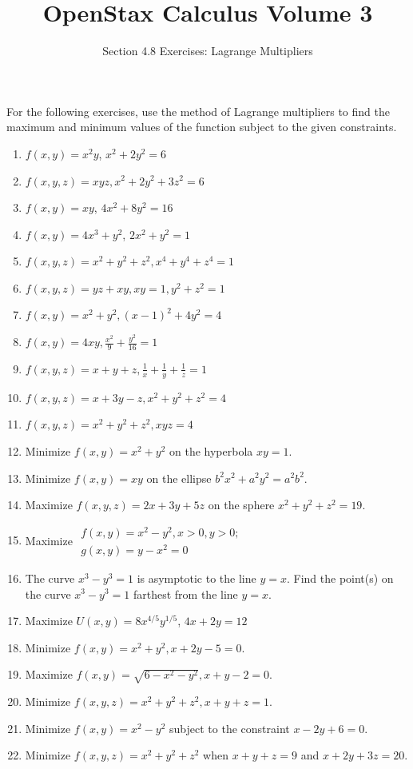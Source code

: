 \documentclass{exercises}
\title{OpenStax Calculus Volume 3}
\subtitle{Section 4.8 Exercises: Lagrange Multipliers}
\author{}
\date{}
\begin{document}
\maketitle


For the following exercises, use the method of Lagrange multipliers to find the maximum and minimum values of the function subject to the given constraints.

\begin{enumerate}[start=1]
\item $f(x,y)=x^{2}y$, $x^{2}+2y^{2}=6$
\item $f(x,y,z)=xyz,x^{2}+2y^{2}+3z^{2}=6$
\item $f(x,y)=xy$, $4x^{2}+8y^{2}=16$
\item $f(x,y)=4x^{3}+y^{2}$, $2x^{2}+y^{2}=1$
\item $f(x,y,z)=x^{2}+y^{2}+z^{2},x^{4}+y^{4}+z^{4}=1$
\item $f(x,y,z)=yz+xy,xy=1,y^{2}+z^{2}=1$
\item $f(x,y)=x^{2}+y^{2},{(x-1)}^{2}+4y^{2}=4$
\item $f(x,y)=4xy,\frac{x^{2}}{9}+\frac{y^{2}}{16}=1$
\item $f(x,y,z)=x+y+z,\frac{1}{x}+\frac{1}{y}+\frac{1}{z}=1$
\item $f(x,y,z)=x+3y-z,x^{2}+y^{2}+z^{2}=4$
\item $f(x,y,z)=x^{2}+y^{2}+z^{2},xyz=4$
\item Minimize $f(x,y)=x^{2}+y^{2}$ on the hyperbola $xy=1$.
\item Minimize $f(x,y)=xy$ on the ellipse $b^{2}x^{2}+a^{2}y^{2}=a^{2}b^{2}$.
\item Maximize $f(x,y,z)=2x+3y+5z$ on the sphere $x^{2}+y^{2}+z^{2}=19$.
\item Maximize $\begin{array}{l}f(x,y)=x^{2}-y^{2},x>0,y>0; \\ g(x,y)=y-x^{2}=0\end{array}$
\item The curve $x^{3}-y^{3}=1$ is asymptotic to the line $y=x$. Find the point(s) on the curve $x^{3}-y^{3}=1$ farthest from the line $y=x$.
\item Maximize $U(x,y)=8x^{4/5}y^{1/5}$, $4x+2y=12$
\item Minimize $f(x,y)=x^{2}+y^{2},x+2y-5=0$.
\item Maximize $f(x,y)=\sqrt{6-x^{2}-y^{2}},x+y-2=0$.
\item Minimize $f(x,y,z)=x^{2}+y^{2}+z^{2},x+y+z=1$.
\item Minimize $f(x,y)=x^{2}-y^{2}$ subject to the constraint $x-2y+6=0$.
\item Minimize $f(x,y,z)=x^{2}+y^{2}+z^{2}$ when $x+y+z=9$ and $x+2y+3z=20$.
\end{enumerate}
\end{document}
